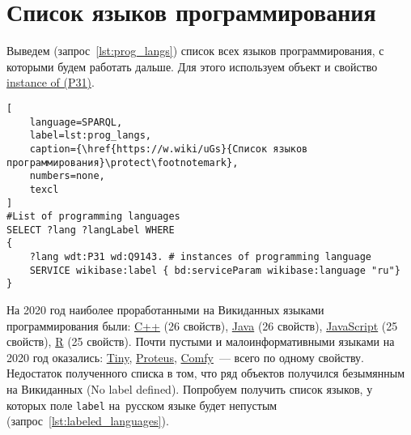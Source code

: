 \section{Список языков программирования}
%
%
Выведем (запрос~\ref{lst:prog_langs}) список всех языков программирования, 
с которыми будем работать дальше. 
Для этого используем объект  
и свойство \href{https://www.wikidata.org/wiki/Property:P31}{instance of (P31)}.

\begin{lstlisting}[
	language=SPARQL,
	label=lst:prog_langs,
	caption={\href{https://w.wiki/uGs}{Список языков программирования}\protect\footnotemark},
    numbers=none,
	texcl 
]
#List of programming languages
SELECT ?lang ?langLabel WHERE
{
    ?lang wdt:P31 wd:Q9143. # instances of programming language
    SERVICE wikibase:label { bd:serviceParam wikibase:language "ru"}
}
\end{lstlisting}

На 2020 год наиболее проработанными на Викиданных языками программирования были: \href{https://www.wikidata.org/wiki/Q2407}{C++} (26 свойств), \href{https://www.wikidata.org/wiki/Q251}{Java} (26 свойств), \href{https://www.wikidata.org/wiki/Q2005}{JavaScript} (25 свойств), \href{https://www.wikidata.org/wiki/Q206904}{R} (25 свойств).
Почти пустыми и малоинформативными языками на 2020 год оказались\autocite{prowd_langs_link}: 
\href{https://www.wikidata.org/wiki/Q3991643}{Tiny}, 
\href{https://www.wikidata.org/wiki/Q3924253}{Proteus}, 
\href{https://www.wikidata.org/wiki/Q21524853}{Comfy}~--- всего по одному свойству.
Недостаток полученного списка в том, 
что ряд объектов получился безымянным на Викиданных (No label defined). 
Попробуем получить список языков, у которых поле \lstinline|label| на~русском языке будет непустым (запрос~\ref{lst:labeled_languages}).




